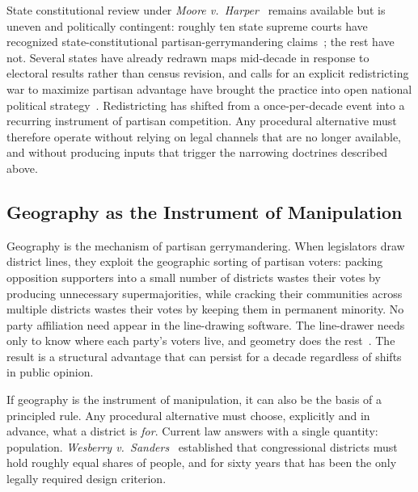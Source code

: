 State constitutional review under \textit{Moore v.~Harper}~\cite{moore2023}
remains available but is uneven and politically contingent: roughly
ten state supreme courts have recognized state-constitutional
partisan-gerrymandering claims~\cite{stateline2025}; the rest have
not. Several states have already redrawn maps mid-decade in response
to electoral results rather than census revision, and calls for an
explicit redistricting war to maximize partisan advantage have
brought the practice into open national political
strategy~\cite{trump2025redistrict}. Redistricting has shifted from
a once-per-decade event into a recurring instrument of partisan
competition. Any procedural alternative must therefore operate
without relying on legal channels that are no longer available, and
without producing inputs that trigger the narrowing doctrines
described above.

\subsection{Geography as the Instrument of Manipulation}
\label{sec:intro-geo}

Geography is the mechanism of partisan gerrymandering. When
legislators draw district lines, they exploit the geographic sorting
of partisan voters: packing opposition supporters into a small number
of districts wastes their votes by producing unnecessary supermajorities,
while cracking their communities across multiple districts wastes
their votes by keeping them in permanent minority. No party
affiliation need appear in the line-drawing software. The line-drawer
needs only to know where each party's voters live, and geometry does
the rest~\cite{chenrodden2013}. The result is a structural advantage
that can persist for a decade regardless of shifts in public opinion.

If geography is the instrument of manipulation, it can also be the
basis of a principled rule. Any procedural alternative must choose,
explicitly and in advance, what a district is \emph{for}. Current
law answers with a single quantity: population.
\textit{Wesberry v.~Sanders}~\cite{wesberry1964} established that
congressional districts must hold roughly equal shares of people,
and for sixty years that has been the only legally required design
criterion.

